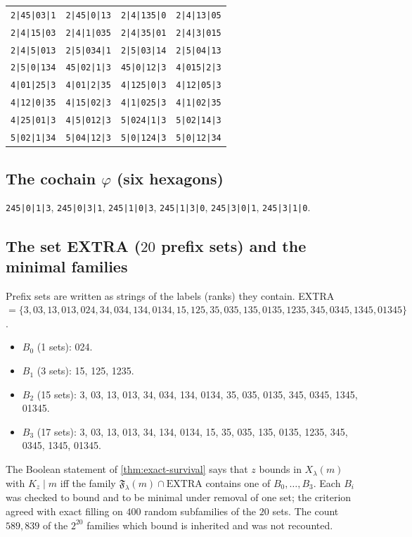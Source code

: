 \begin{center}
\begin{tabular}{llll}
\texttt{2|45|03|1} & \texttt{2|45|0|13} & \texttt{2|4|135|0} & \texttt{2|4|13|05} \\
\texttt{2|4|15|03} & \texttt{2|4|1|035} & \texttt{2|4|35|01} & \texttt{2|4|3|015} \\
\texttt{2|4|5|013} & \texttt{2|5|034|1} & \texttt{2|5|03|14} & \texttt{2|5|04|13} \\
\texttt{2|5|0|134} & \texttt{45|02|1|3} & \texttt{45|0|12|3} & \texttt{4|015|2|3} \\
\texttt{4|01|25|3} & \texttt{4|01|2|35} & \texttt{4|125|0|3} & \texttt{4|12|05|3} \\
\texttt{4|12|0|35} & \texttt{4|15|02|3} & \texttt{4|1|025|3} & \texttt{4|1|02|35} \\
\texttt{4|25|01|3} & \texttt{4|5|012|3} & \texttt{5|024|1|3} & \texttt{5|02|14|3} \\
\texttt{5|02|1|34} & \texttt{5|04|12|3} & \texttt{5|0|124|3} & \texttt{5|0|12|34} \\
\end{tabular}\end{center}

\subsection*{The cochain $\varphi$ (six hexagons)}
\texttt{245|0|1|3}, \texttt{245|0|3|1}, \texttt{245|1|0|3}, \texttt{245|1|3|0}, \texttt{245|3|0|1}, \texttt{245|3|1|0}.

\subsection*{The set EXTRA ($20$ prefix sets) and the minimal families}
Prefix sets are written as strings of the labels (ranks) they contain. EXTRA $=\{3, 03, 13, 013, 024, 34, 034, 134, 0134, 15, 125, 35, 035, 135, 0135, 1235, 345, 0345, 1345, 01345\}$.
\begin{itemize}
\item $B_0$ (1 sets): 024.
\item $B_1$ (3 sets): 15, 125, 1235.
\item $B_2$ (15 sets): 3, 03, 13, 013, 34, 034, 134, 0134, 35, 035, 0135, 345, 0345, 1345, 01345.
\item $B_3$ (17 sets): 3, 03, 13, 013, 34, 134, 0134, 15, 35, 035, 135, 0135, 1235, 345, 0345, 1345, 01345.
\end{itemize}

The Boolean statement of \cref{thm:exact-survival} says that $z$ bounds in $X_\lambda(m)$ with $K_z\mid m$ iff the family $\mathfrak F_\lambda(m)\cap\mathrm{EXTRA}$ contains one of $B_0,\dots,B_3$. Each $B_i$ was checked to bound and to be minimal under removal of one set; the criterion agreed with exact filling on $400$ random subfamilies of the $20$ sets. The count $589{,}839$ of the $2^{20}$ families which bound is inherited and was not recounted.


